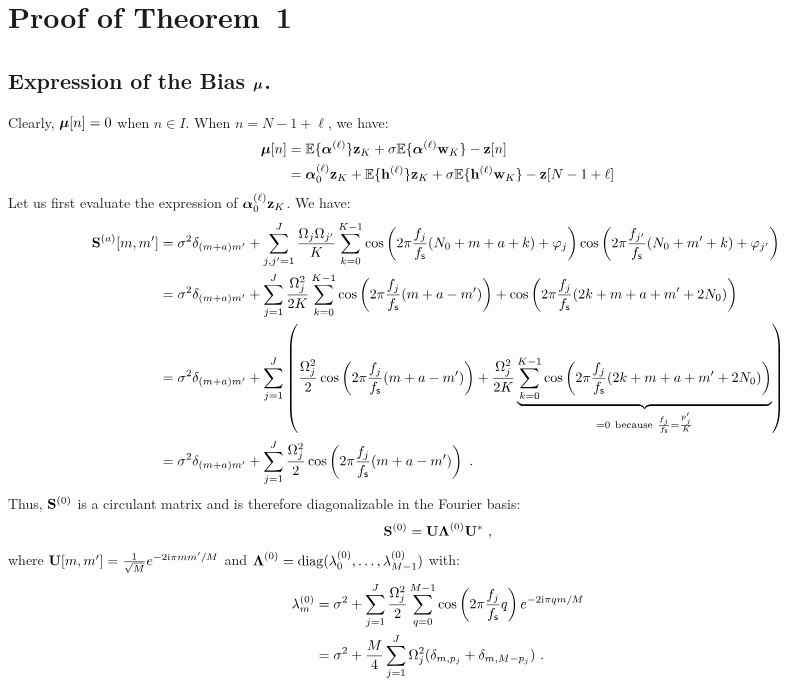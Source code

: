 \documentclass[journal,onecolumn]{IEEEtran}
\begin{document}
\section{Proof of Theorem~1}
\label{ap:th.error}

\subsection{Expression of the Bias $\boldsymbol{\mu}$.}
Clearly, $\boldsymbol{\mu}[n]=0$ when $n\in I$. When $n=N-1+\ell$, we have:
\begin{align*}
\boldsymbol{\mu}[n] &=  {\mathbb E}\{\boldsymbol{\alpha}^{(\ell)}\}{\mathbf z}_{K} + \sigma{\mathbb E}\{\boldsymbol{\alpha}^{(\ell)}{\mathbf w}_{K}\} - {\mathbf z}[n]\\
& = \boldsymbol{\alpha}_0^{(\ell)}{\mathbf z}_{K} + {\mathbb E}\{{\mathbf h}^{(\ell)}\}{\mathbf z}_{K} + \sigma{\mathbb E}\{{\mathbf h}^{(\ell)}{\mathbf w}_{K}\} - {\mathbf z}[N-1+\ell]
\end{align*}
Let us first evaluate the expression of $\boldsymbol{\alpha}_0^{(\ell)}{\mathbf z}_K$. We have:
\begin{align*}
\bS^{(a)}[m,m'] &= \sigma^2\delta_{(m+a)m'}+\sum_{j,j'=1}^J\dfrac{\Omega_j\Omega_{j'}}{K}\sum_{k=0}^{K-1} \cos\left(2\pi \frac{f_j}{\fs}(N_0+m+a+k)+\varphi_j\right)\cos\left(2\pi \frac{f_{j'}}{\fs}(N_0+m'+k)+\varphi_{j'}\right) \\
&= \sigma^2\delta_{(m+a)m'}+\sum_{j=1}^J\dfrac{\Omega_j^2}{2K}\sum_{k=0}^{K-1} \cos\left(2\pi \frac{f_j}{\fs}(m+a-m')\right) + \cos\left(2\pi \frac{f_j}{\fs}(2k+m+a+m'+2N_0)\right)\\
&= \sigma^2\delta_{(m+a)m'}+\sum_{j=1}^J\left( \dfrac{\Omega_j^2}2\cos\left(2\pi \frac{f_j}{\fs}(m+a-m')\right) + \dfrac{\Omega_j^2}{2K}\underbrace{\sum_{k=0}^{K-1}\cos\left(2\pi \frac{f_j}{\fs}(2k+m+a+m'+2N_0)\right)}_{=0\ \mathrm{because}\ \frac{f_j}\fs=\frac{p'_j}K } \right)\\
&= \sigma^2\delta_{(m+a)m'}+\sum_{j=1}^J\dfrac{\Omega_j^2}2\cos\left(2\pi \frac{f_j}{\fs}(m+a-m')\right)\ .
\end{align*}
Thus, ${\mathbf S}^{(0)}$ is a circulant matrix and is therefore diagonalizable in the Fourier basis:
\[
{\mathbf S}^{(0)} = {\mathbf U}\boldsymbol{\Lambda}^{(0)}{\mathbf U}^*\ ,
\]
where ${\mathbf U}[m,m']=\frac1{\sqrt{M}}e^{-2\mathrm{i}\pi mm'/M}$ and $\boldsymbol{\Lambda}^{(0)} = \mathrm{diag}(\lambda_0^{(0)},\dots,\lambda_{M-1}^{(0)})$ with:
\begin{align*}
\lambda_m^{(0)} &= \sigma^2 + \sum_{j=1}^J\dfrac{\Omega_j^2}2\sum_{q=0}^{M-1} \cos\left(2\pi\frac{f_j}{f_{\mathsf s}} q\right) e^{-2\mathrm{i}\pi qm/M} \\
&= \sigma^2 + \dfrac{M}{4}\sum_{j=1}^J\Omega_j^2(\delta_{m,p_j} + \delta_{m,M-p_j})\ .
\end{align*}
\end{document}
